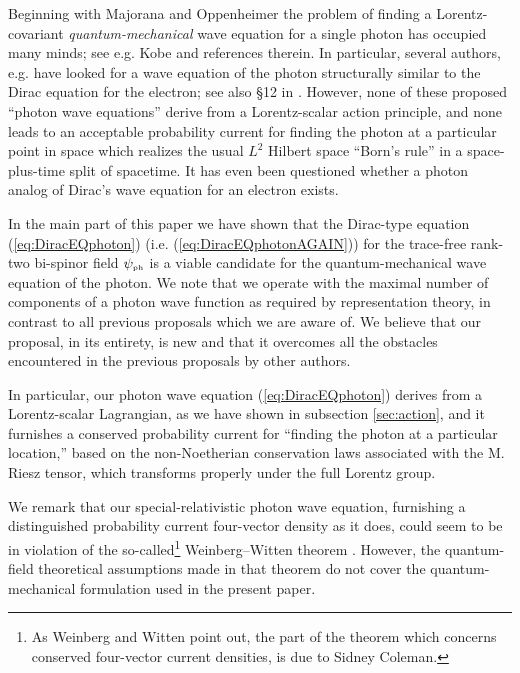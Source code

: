 \documentclass[12pt]{article}
\theoremstyle{definition}
\newcommand{\refeq}[1]{(\ref{#1})}
\numberwithin{equation}{section}
\newcommand{\psiPH}{{\psi_{\mbox{\rm\tiny ph}}}}
\begin{document}
  Beginning with Majorana \cite{MajoranaUnpublished} and Oppenheimer \cite{OppiPHOTON} the problem of finding a
Lorentz-covariant \emph{quantum-mechanical} wave equation for a single photon has occupied many minds; see e.g. Kobe \cite{Kob1999} 
and references therein.
 In particular, several authors, e.g. \cite{OppiPHOTON, Good1957, SachsSchwebel, MosesQM, BiBiTHREE, TamburiniVicino, Mohr} have looked 
for a wave equation of the photon structurally similar to the Dirac equation for the electron; see also
{\S}12 in \cite{IBBphotonREV}.
 However, none of these proposed ``photon wave equations'' derive from a Lorentz-scalar action principle, and none
leads to an acceptable probability current for finding the photon at a particular point in space  which realizes the
usual $L^2$ Hilbert space ``Born's rule'' in a space-plus-time split of spacetime.
 It has even been questioned whether a photon analog of Dirac's wave equation for an electron exists. 

 In the main part of this paper we have shown that the Dirac-type equation \refeq{eq:DiracEQphoton} (i.e. \refeq{eq:DiracEQphotonAGAIN}) for 
the trace-free rank-two bi-spinor field $\psiPH$ is a viable candidate for the quantum-mechanical wave equation of the photon.
 We note that we operate with the maximal number of components of a photon wave function as required by representation theory,
in contrast to all previous proposals which we are aware of.
 We believe that our proposal, in its entirety, is new and that it overcomes all the obstacles encountered in the previous proposals
by other authors. 

 In particular, our photon wave equation \refeq{eq:DiracEQphoton} derives from a Lorentz-scalar Lagrangian, as we have shown 
in subsection \ref{sec:action}, and it furnishes a conserved probability current for ``finding the photon at a particular location,'' 
based on the non-Noetherian conservation laws associated with the M. Riesz tensor, which transforms properly under the full Lorentz group.

 We remark that our special-relativistic photon wave equation, furnishing a distinguished probability current four-vector density as it
does, could seem to be in violation of the so-called\footnote{As Weinberg and Witten point
  out, the part of the theorem which concerns conserved four-vector current densities, is due to Sidney Coleman.}
 Weinberg--Witten theorem \cite{WeinbergWitten}.
 However, the quantum-field theoretical assumptions made in that theorem do not cover the quantum-mechanical formulation used in 
the present paper. 
\end{document}
